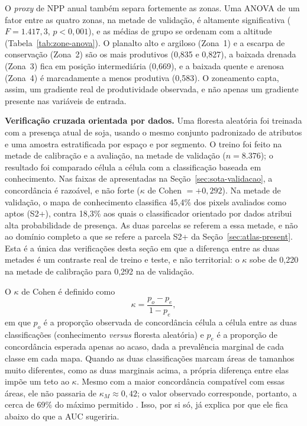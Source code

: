 O \emph{proxy} de NPP anual também separa fortemente as zonas. Uma ANOVA de um fator entre as
quatro zonas, na metade de validação, é altamente significativa ($F = 1.417{,}3$,
$p < 0{,}001$), e as médias de grupo se ordenam com a altitude (Tabela~\ref{tab:zone-anova}). O
planalto alto e argiloso (Zona~1) e a escarpa de conservação (Zona~2) são os mais produtivos (0,835 e
0,827), a baixada drenada (Zona~3) fica em posição intermediária (0,669), e a baixada quente e arenosa
(Zona~4) é marcadamente a menos produtiva (0,583). O zoneamento capta, assim, um gradiente real de
produtividade observada, e não apenas um gradiente presente nas variáveis de entrada.

\begin{table}[htbp]
\centering
\caption{NPP média do MOD17 (unidades escalonadas) por zona, na metade de validação da
partição espacial. ANOVA de um fator: $F = 1.417{,}3$, $p < 0{,}001$.}
\label{tab:zone-anova}

\end{table}

\textbf{Verificação cruzada orientada por dados.} Uma floresta aleatória foi treinada com a presença
atual de soja, usando o mesmo conjunto padronizado de atributos e uma amostra estratificada por espaço
e por segmento. O treino foi feito na metade de calibração e a avaliação, na metade de validação
($n = 8.376$); o resultado foi comparado célula a célula com a classificação baseada em
conhecimento. Nas faixas de \citet{landis_measurement_1977} apresentadas na
Seção~\ref{sec:sota-validacao}, a concordância é razoável, e não forte ($\kappa$ de Cohen
$= +0{,}292$). Na metade de validação, o mapa de conhecimento classifica 45,4\% dos pixels avaliados
como aptos (S2+), contra 18,3\% aos quais o classificador orientado por dados atribui alta
probabilidade de presença. As duas parcelas se referem a essa metade, e não ao domínio completo a que
se refere a parcela S2+ da Seção~\ref{sec:atlas-present}. Esta é a única das verificações desta seção
em que a diferença entre as duas metades é um contraste real de treino e teste, e não territorial: o
$\kappa$ sobe de 0,220 na metade de calibração para 0,292 na de validação.

O $\kappa$ de Cohen é definido como
\begin{equation*}
  \kappa = \frac{p_o - p_e}{1 - p_e},
\end{equation*}
em que $p_o$ é a proporção observada de concordância célula a célula entre as duas
classificações (conhecimento \emph{versus} floresta aleatória) e $p_e$ é a proporção de
concordância esperada apenas ao acaso, dada a prevalência marginal de cada classe em cada mapa.
Quando as duas classificações marcam áreas de tamanhos muito diferentes, como as duas
marginais acima, a própria diferença entre elas impõe um teto ao $\kappa$. Mesmo com a maior
concordância compatível com essas áreas, ele não passaria de $\kappa_M \approx 0{,}42$; o valor
observado corresponde, portanto, a cerca de 69\% do máximo permitido
\citep[pp.~42--43]{cohen_coefficient_1960}. Isso, por si só, já explica por que ele fica abaixo do que
a AUC sugeriria.

